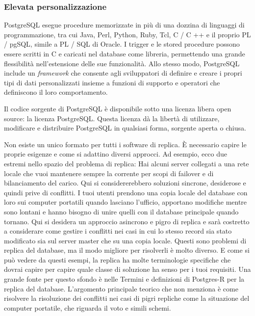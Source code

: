 \subsubsection{Elevata personalizzazione}
PostgreSQL esegue procedure memorizzate in pi\`{u} di una dozzina di linguaggi di programmazione, tra cui Java, Perl, Python, Ruby, Tcl, C / C ++ e il proprio PL / pgSQL, simile a PL / SQL di Oracle. I trigger e le stored procedure possono essere scritti in C e caricati nel database come libreria, permettendo una grande flessibilit\`{a} nell'estensione delle sue funzionalit\`{a}. Allo stesso modo, PostgreSQL include un \textit{framework} che consente agli sviluppatori di definire e creare i propri tipi di dati personalizzati insieme a funzioni di supporto e operatori che definiscono il loro comportamento.

Il codice sorgente di PostgreSQL \`{e} disponibile sotto una licenza libera open source: la licenza PostgreSQL. Questa licenza d\`{a} la libert\`{a} di utilizzare, modificare e distribuire PostgreSQL in qualsiasi forma, sorgente aperta o chiusa.\cite{etichetta15}

Non esiste un unico formato per tutti i software di replica. \`{E} necessario capire le proprie esigenze e come si adattino diversi approcci. Ad esempio, ecco due estremi nello spazio del problema di replica:
Hai alcuni server collegati a una rete locale che vuoi mantenere sempre la corrente per scopi di failover e di bilanciamento del carico. Qui si considererebbero soluzioni sincrone, desiderose e quindi prive di conflitti.
I tuoi utenti prendono una copia locale del database con loro sui computer portatili quando lasciano l'ufficio, apportano modifiche mentre sono lontani e hanno bisogno di unire quelli con il database principale quando tornano. Qui si desidera un approccio asincrono e pigro di replica e sarà costretto a considerare come gestire i conflitti nei casi in cui lo stesso record sia stato modificato sia sul server master che su una copia locale.
Questi sono problemi di replica del database, ma il modo migliore per risolverli è molto diverso. E come si può vedere da questi esempi, la replica ha molte terminologie specifiche che dovrai capire per capire quale classe di soluzione ha senso per i tuoi requisiti. Una grande fonte per questo sfondo è nelle Termini e definizioni di Postgres-R per la replica del database. L'argomento principale teorico che non menziona è come risolvere la risoluzione dei conflitti nei casi di pigri repliche come la situazione del computer portatile, che riguarda il voto e simili schemi.

